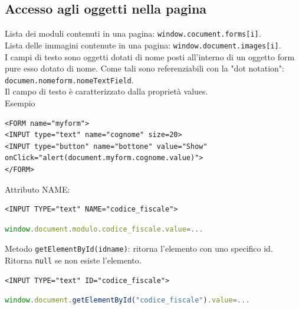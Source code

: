 \documentclass{article}
\begin{document}
\subsection{Accesso agli oggetti nella pagina}
Lista dei moduli contenuti in una pagina: \texttt{window.cocument.forms[i]}.
\\ Lista delle immagini contenute in una pagina: \texttt{window.document.images[i]}.
\\ I campi di testo sono oggetti dotati di nome posti all'interno di un oggetto form pure esso dotato di nome. Come tali sono referenziabili con la "dot notation": \texttt{documen.nomeform.nomeTextField}.
\\ Il campo di testo è caratterizzato dalla proprietà values.
\\ Esempio
\begin{lstlisting}[style=htmlstyle]
<FORM name="myform">
<INPUT type="text" name="cognome" size=20>
<INPUT type="button" name="bottone" value="Show"
onClick="alert(document.myform.cognome.value)">
</FORM>
\end{lstlisting}
Attributo NAME:
\begin{lstlisting}[style=htmlstyle]
<INPUT TYPE="text" NAME="codice_fiscale">
\end{lstlisting}
\begin{lstlisting}[language=JavaScript]
window.document.modulo.codice_fiscale.value=...
\end{lstlisting}
Metodo \texttt{getElementById(idname)}: ritorna l'elemento con uno specifico id. Ritorna \texttt{null} se non esiste l'elemento.
\begin{lstlisting}[style=htmlstyle]
<INPUT TYPE="text" ID="codice_fiscale">
\end{lstlisting}
\begin{lstlisting}[language=JavaScript]
window.document.getElementById("codice_fiscale").value=...
\end{lstlisting}
\end{document}
